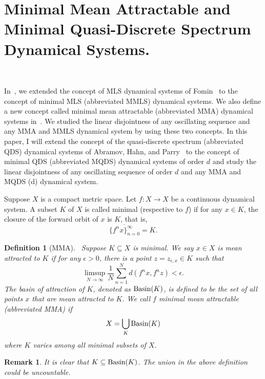 \documentclass[12pt,letterpaper]{amsart}
\newtheorem{remark}{Remark}
\newtheorem {definition}{Definition}
\begin{document}
 \section{Minimal Mean Attractable and Minimal Quasi-Discrete Spectrum Dynamical Systems.}~\label{mmamqds}  
 
 In~\cite{FJ}, we extended the concept of MLS dynamical systems of Fomin~\cite{Fo} to the concept of minimal MLS (abbreviated MMLS) dynamical systems. We also define a new concept called minimal mean attractable (abbreviated MMA) dynamical systems in~\cite{FJ}. We studied the linear disjointness of any oscillating sequence and any MMA and MMLS dynamical system by using these two concepts. In this paper, I will extend the concept of the quasi-discrete spectrum (abbreviated QDS) dynamical systems of Abramov, Hahn, and Parry~\cite{Ab,HP} to the concept of minimal QDS (abbreviated MQDS) dynamical systems of order $d$ and study the linear disjointness of any oscillating sequence of order $d$ and any MMA and MQDS (d) dynamical system.   

 \medskip
Suppose $X$ is a compact metric space. Let $f: X\to X$ be a continuous dynamical system. A subset $K$ of $X$ is called minimal (respective to $f$) if for any $x\in K$, the closure of the forward orbit of $x$ is $K$, that is, 
$$
\overline{\{ f^{n}x\}_{n=0}^{\infty}}=K.
$$

\medskip  
\begin{definition}[MMA]~\label{mma}
Suppose $K\subseteq X$ is minimal. We say $x\in X$ is {\em mean attracted} to $K$ if for any $\epsilon >0$, there is a point $z=z_{\epsilon, x}\in K$ such that
\begin{equation}\label{MA}
  \limsup_{N\to\infty} \frac{1}{N} \sum_{n=1}^{N} d(f^n x, f^n z) <\epsilon.
\end{equation}
The {\em basin of attraction} of $K$, denoted as ${\rm Basin}(K)$, is defined to be the set of all points $x$ that are mean attracted to $K$. 
We call $f$ {\em minimal mean attractable} (abbreviated MMA) if
\begin{equation}\label{Decomp}
  X= \bigcup_{K} \mbox{\rm Basin}(K)
\end{equation}
where $K$ varies among all minimal subsets of $X$.
\end{definition}

\medskip
\begin{remark}
It is clear that
$K \subseteq \hbox{\rm Basin}(K)$. The union in the above definition could be uncountable.
\end{remark}
\end{document}
